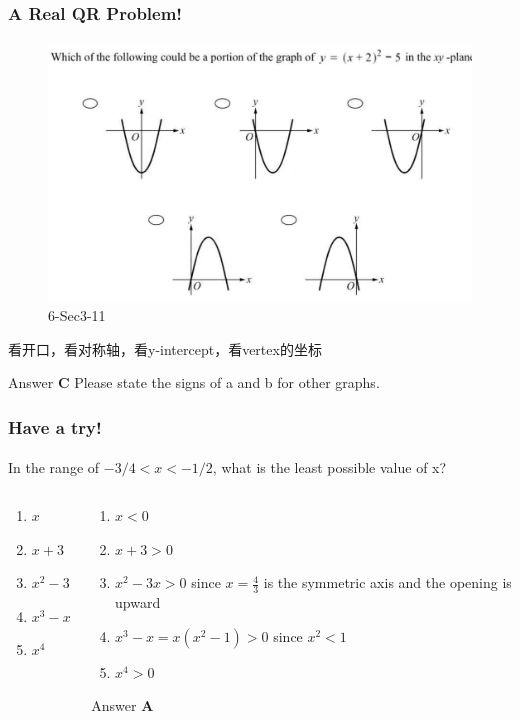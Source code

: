 \documentclass[
	11pt, %
]{beamer}
\begin{document}
\begin{frame}
	\frametitle{A Real QR Problem!}
	\framesubtitle{}

	\begin{figure}
		\includegraphics[width=0.7\linewidth]{Parabola_Example_Question1.png}
		\caption{6-Sec3-11}
	\end{figure}

	\pause

看开口，看对称轴，看y-intercept，看vertex的坐标 \\

\pause

\bigskip
Answer \textbf{C } \pause Please state the signs of a and b for other graphs.

\end{frame}


\begin{frame}
	\frametitle{Have a try!}
	\framesubtitle{}

In the range of $-3/4 < x < -1/2$, what is the least possible value of x?
\bigskip
	\begin{columns}[t] 
		\begin{column}{0.45\textwidth} %
			\begin{enumerate}[A]
				\item $x$
				\item $x + 3$
				\item $x^2 -3x$
				\item $x^3 - x$
				\item $x^4$
			\end{enumerate}
		\end{column}
		\begin{column}{0.5\textwidth} %
		  \pause
			\begin{enumerate}[A]
				\item $x <0$ 
				\item $x + 3 >0$ 
				\item $x^2 -3x>0$ since $x=\frac{4}{3}$ is the symmetric axis and the opening is upward
				\item $x^3 - x= x(x^2 - 1) >0$ since $x^2 <1$
				\item $x^4>0$
			\end{enumerate}
		\bigskip
    Answer \textbf{A}
    \end{column}
	\end{columns}
\end{frame}
\end{document}
